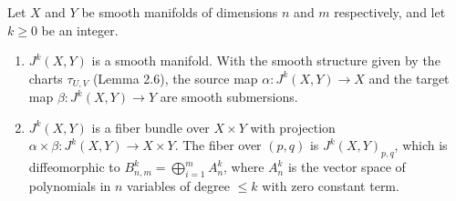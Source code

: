 Let $X$ and $Y$ be smooth manifolds of dimensions $n$ and $m$ respectively, and let $k \geq 0$ be an integer.

\begin{enumerate}
\item $J^k(X, Y)$ is a smooth manifold. With the smooth structure given by the charts $\tau_{U,V}$ (Lemma 2.6), the source map $\alpha: J^k(X, Y) \to X$ and the target map $\beta: J^k(X, Y) \to Y$ are smooth submersions.

\item $J^k(X, Y)$ is a fiber bundle over $X \times Y$ with projection $\alpha \times \beta: J^k(X, Y) \to X \times Y$. The fiber over $(p, q)$ is $J^k(X, Y)_{p,q}$, which is diffeomorphic to $B_{n,m}^k = \bigoplus_{i=1}^m A_n^k$, where $A_n^k$ is the vector space of polynomials in $n$ variables of degree $\leq k$ with zero constant term.
\end{enumerate}
